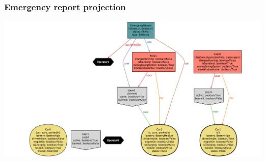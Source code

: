 \begin{landscape}
		\subsubsection{Emergency report projection}
			\includegraphics[height=0.9\textheight, center]{img/emergency_reports.png}
	\end{landscape}
